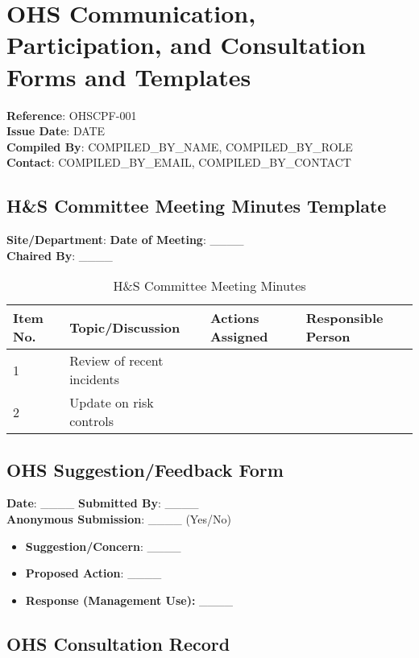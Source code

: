 \documentclass[11pt]{article}
\newcommand{\docTitle}{OHS Communication, Participation, and Consultation Forms and Templates}
\newcommand{\refNumber}{OHSCPF-001}
\newcommand{\issueDate}{{{DATE}}}
\newcommand{\location}{}
\newcommand{\compilerName}{{{COMPILED_BY_NAME}}}
\newcommand{\compilerRole}{{{COMPILED_BY_ROLE}}}
\newcommand{\compilerEmail}{{{COMPILED_BY_EMAIL}}}
\newcommand{\compilerPhone}{{{COMPILED_BY_CONTACT}}}
\begin{document}
\section*{\docTitle}
\textbf{Reference}: \refNumber \\
\textbf{Issue Date}: \issueDate \\
\textbf{Compiled By}: \compilerName, \compilerRole \\
\textbf{Contact}: \compilerEmail, \compilerPhone

\subsection*{H\&S Committee Meeting Minutes Template}

\textbf{Site/Department}: \location \textbf{Date of Meeting}: \_\_\_\_ \\
\textbf{Chaired By}: \_\_\_\_

\begin{table}[h]
    \centering
    \begin{tabular}{p{2cm}p{4cm}p{3cm}p{3cm}}
        \toprule
        \textbf{Item No.} & \textbf{Topic/Discussion} & \textbf{Actions Assigned} & \textbf{Responsible Person} \\
        \midrule
        1 & Review of recent incidents & & \\
        2 & Update on risk controls & & \\
        \bottomrule
    \end{tabular}
    \caption{H\&S Committee Meeting Minutes}
\end{table}

\subsection*{OHS Suggestion/Feedback Form}

\textbf{Date}: \_\_\_\_ \textbf{Submitted By}: \_\_\_\_ \\
\textbf{Anonymous Submission}: \_\_\_\_ (Yes/No)

\begin{itemize}
    \item \textbf{Suggestion/Concern}: \_\_\_\_
    \item \textbf{Proposed Action}: \_\_\_\_
    \item \textbf{Response (Management Use):} \_\_\_\_
\end{itemize}

\subsection*{OHS Consultation Record}
\end{document}

